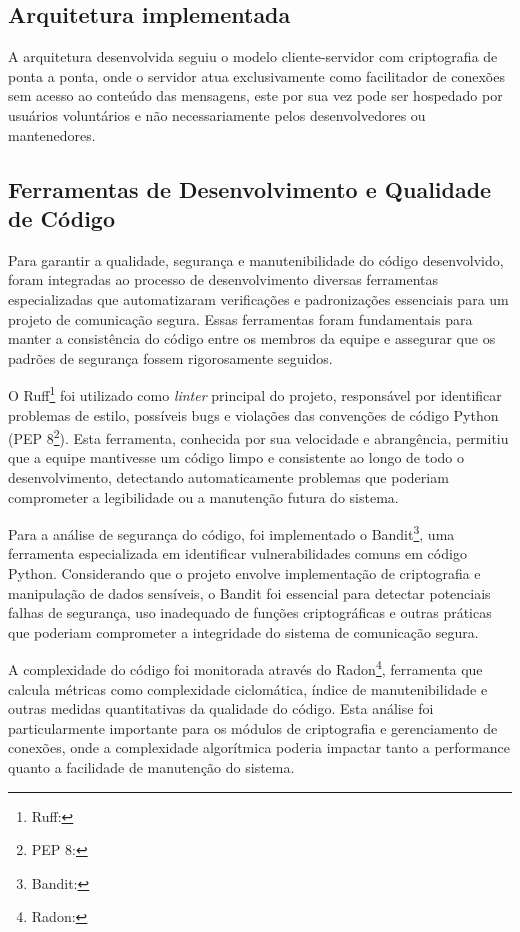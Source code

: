 \subsection{Arquitetura implementada}

A arquitetura desenvolvida seguiu o modelo cliente-servidor com
criptografia de ponta a ponta, onde o servidor atua exclusivamente
como facilitador de conexões sem acesso ao conteúdo das mensagens,
este por sua vez pode ser hospedado por usuários voluntários e não
necessariamente pelos desenvolvedores ou mantenedores.

\subsection{Ferramentas de Desenvolvimento e Qualidade de Código}

Para garantir a qualidade, segurança e manutenibilidade do código
desenvolvido, foram integradas ao processo de desenvolvimento
diversas ferramentas especializadas que automatizaram verificações e
padronizações essenciais para um projeto de comunicação segura. Essas
ferramentas foram fundamentais para manter a consistência do código
entre os membros da equipe e assegurar que os padrões de segurança
fossem rigorosamente seguidos.

O Ruff\footnote{Ruff: } foi utilizado
como \textit{linter} principal do projeto, responsável
por identificar problemas de estilo, possíveis bugs e violações das
convenções de código Python (PEP
8\footnote{PEP 8: }). Esta
ferramenta, conhecida por
sua velocidade e abrangência, permitiu que a equipe mantivesse um
código limpo e consistente ao longo de todo o desenvolvimento,
detectando automaticamente problemas que poderiam comprometer a
legibilidade ou a manutenção futura do sistema.

Para a análise de segurança do código, foi implementado o
Bandit\footnote{Bandit: }, uma
ferramenta especializada em identificar vulnerabilidades comuns em
código Python. Considerando que o projeto envolve implementação de
criptografia e manipulação de dados sensíveis, o Bandit foi essencial
para detectar potenciais falhas de segurança, uso inadequado de
funções criptográficas e outras práticas que poderiam comprometer a
integridade do sistema de comunicação segura.

A complexidade do código foi monitorada através do
Radon\footnote{Radon:
}, ferramenta
que calcula métricas como complexidade ciclomática, índice de
manutenibilidade e outras medidas quantitativas da qualidade do
código. Esta análise foi particularmente importante para os módulos
de criptografia e gerenciamento de conexões, onde a complexidade
algorítmica poderia impactar tanto a performance quanto a facilidade
de manutenção do sistema.

